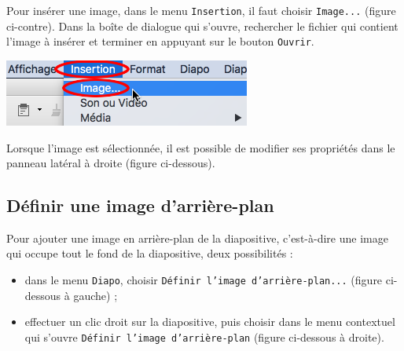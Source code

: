 \begin{minipage}[c]{.68\textwidth}
Pour insérer une image, dans le menu \texttt{Insertion}, il faut choisir \texttt{Image...} (figure ci-contre). Dans la boîte de dialogue qui s'ouvre, rechercher le fichier qui contient l'image à insérer et terminer en appuyant sur le bouton \texttt{Ouvrir}.
\end{minipage}\hfill%
\begin{minipage}[c]{.28\textwidth}
\centering%
\includegraphics[angle=0,width=\textwidth]{./images/presentation/Impress_07DiaSansFormat_08}
\end{minipage}

\vspace{1em}

Lorsque l'image est sélectionnée, il est possible de modifier ses propriétés dans le panneau latéral à droite (figure ci-dessous).












\subsection{Définir une image d'arrière-plan}\label{Presentation1imageFond}

Pour ajouter une image en arrière-plan de la diapositive, c'est-à-dire une image qui occupe tout le fond de la diapositive, deux possibilités :

\begin{itemize}
\item dans le menu \texttt{Diapo}, choisir \texttt{Définir l'image d'arrière-plan...} (figure ci-dessous à gauche) ;
\item effectuer un clic droit sur la diapositive, puis choisir dans le menu contextuel qui s'ouvre \texttt{Définir l'image d'arrière-plan} (figure ci-dessous à droite).
\end{itemize}

